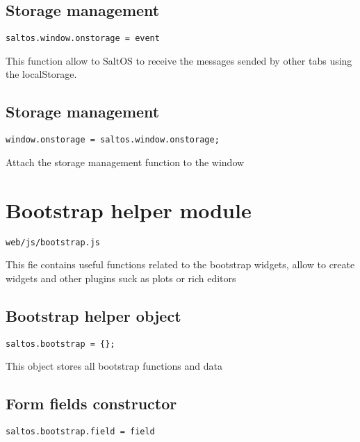 \documentclass[a4paper]{book}
\begin{document}
\hypertarget{toc450}{}
\subsection{Storage management}

\begin{lstlisting}
saltos.window.onstorage = event
\end{lstlisting}

This function allow to SaltOS to receive the messages sended by other tabs
using the localStorage.

\hypertarget{toc451}{}
\subsection{Storage management}

\begin{lstlisting}
window.onstorage = saltos.window.onstorage;
\end{lstlisting}

Attach the storage management function to the window

\hypertarget{toc452}{}
\section{Bootstrap helper module}

\begin{lstlisting}
web/js/bootstrap.js
\end{lstlisting}

This fie contains useful functions related to the bootstrap widgets, allow to create widgets and
other plugins suck as plots or rich editors

\hypertarget{toc453}{}
\subsection{Bootstrap helper object}

\begin{lstlisting}
saltos.bootstrap = {};
\end{lstlisting}

This object stores all bootstrap functions and data

\hypertarget{toc454}{}
\subsection{Form fields constructor}

\begin{lstlisting}
saltos.bootstrap.field = field
\end{lstlisting}
\end{document}
